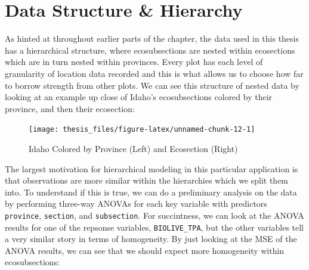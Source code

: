 \documentclass[12pt,twoside]{reedthesis}
\begin{document}
\hypertarget{data-structure-hierarchy}{%
\section{Data Structure \& Hierarchy}\label{data-structure-hierarchy}}

As hinted at throughout earlier parts of the chapter, the data used in this thesis has a hierarchical structure, where ecosubsections are nested within ecosections which are in turn nested within provinces. Every plot has each level of granularity of location data recorded and this is what allows us to choose how far to borrow strength from other plots. We can see this structure of nested data by looking at an example up close of Idaho's ecosubsections colored by their province, and then their ecosection:
\begin{figure}

{\centering \texttt{[image: thesis\_files/figure-latex/unnamed-chunk-12-1]} 

}

\caption{Idaho Colored by Province (Left) and Ecosection (Right)}\label{fig:unnamed-chunk-12}
\end{figure}
The largest motivation for hierarchical modeling in this particular application is that observations are more similar within the hierarchies which we split them into. To understand if this is true, we can do a preliminary analysis on the data by performing three-way ANOVAs for each key variable with predictors \texttt{province}, \texttt{section}, and \texttt{subsection}. For succintness, we can look at the ANOVA results for one of the repsonse variables, \texttt{BIOLIVE\_TPA}, but the other variables tell a very similar story in terms of homogeneity. By just looking at the MSE of the ANOVA results, we can see that we should expect more homogeneity within ecosubsections:
\end{document}
